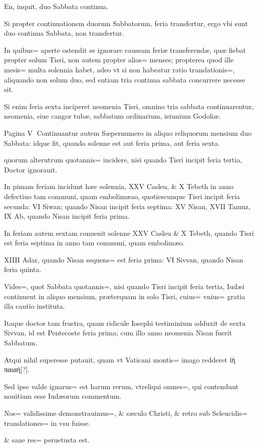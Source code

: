 \begin{parnumbers}
En, inquit, duo Sabbata continua.

Si propter continuationem duorum Sabbatorum, feria transfertur, ergo vbi sunt duo continua Sabbata, non transfertur. 

In quibus= aperte ostendit se ignorare caussam feriæ transferendæ, quæ fiebat propter solum Tisri, non autem propter alios= menses; propterea quod ille mesis= multa solennia habet, adeo vt si non habeatur ratio translationis=, aliquando non solum duo, sed entiam tria continua sabbata concurrere necesse sit.

Si enim feria sexta inciperet neomenia Tisri, omnino tria sabbata continuarentur, neomenia, siue cangor tubæ, sabbatum ordinarium, ieiunium Godoliæ.

Pagina V
Continuantur autem Sæpernumero in aliquo reliquorum mensium duo Sabbata: idque fit, quando solenne est aut feria prima, aut feria sexta.

quorum alterutrum quotannis= incidere, nisi quando Tisri incipit feria tertia, Doctor ignorauit.

In pimam feriam incidunt hæc solennia, XXV Casleu, \& X Tebeth in anno defectiuo tam communi, quam embolimæao, quotiescunque Tisri incipit feria secunda: VI Siwan; quando Nisan incipit feria septima: XV Nisan, XVII Tamuz, IX Ab, quando Nisan incipit feria prima.

In feriam autem sextam conuenit solenne XXV Casleu \& X Tebeth, quando Tisri est feria septima in anno tam communi, quam embolimæo.

XIIII Adar, quando Nisan sequens= est feria prima: VI Sivvan, quando Nisan feria quinta.

Vides=, quot Sabbata quotannis=, nisi quando Tisri incipit feria tertia, Iudæi continuent in aliquo mensium, præterquam in solo Tisri, cuius= vnius= gratia illa cautio instituta.

Itaque doctor tam frustra, quam ridicule Iosephi testiminium adduxit de sexta Sivvan, id est Pentecoste feria prima; cum illo anno neomenia Nisan fuerit Sabbatum.

Atqui nihil superesse putauit, quam vt Vaticani montis= imago redderet ἰὴ παιαή[?].

Sed ipse valde ignarus= est harum rerum, vtreliqui omnes=, qui contendunt nouitium esse Iudæorum commentum.

Nos= validissime demonstrauimus=, \& sæculo Christi, \& retro sub Seleucidis= translationes= in vsu fuisse.

\& sane res= peruetusta est.


\end{parnumbers}
